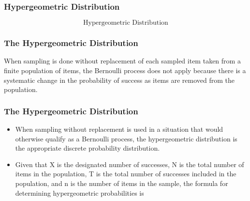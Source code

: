 \documentclass[IntroMain.tex]{subfiles}
\begin{document}
\begin{frame}
	\frametitle{Hypergeometric Distribution}
	\Large
\[	\mbox{Hypergeometric Distribution}\]
\end{frame}
\begin{frame}
\frametitle{The Hypergeometric Distribution }
	
	When sampling is done without replacement of each sampled item taken from a finite population of items, the
	Bernoulli process does not apply because there is a systematic change in the probability of success as items are
	removed from the population. 
	
\end{frame}
\begin{frame}
\frametitle{The Hypergeometric Distribution }	
	
	\begin{itemize}
	\item	When sampling without replacement is used in a situation that would otherwise
		qualify as a Bernoulli process, the hypergeometric distribution is the appropriate discrete probability distribution.
	\item	Given that X is the designated number of successes, N is the total number of items in the population, T is
		the total number of successes included in the population, and n is the number of items in the sample, the formula
		for determining hypergeometric probabilities is
	\end{itemize}

	
\end{frame}

\end{document}
